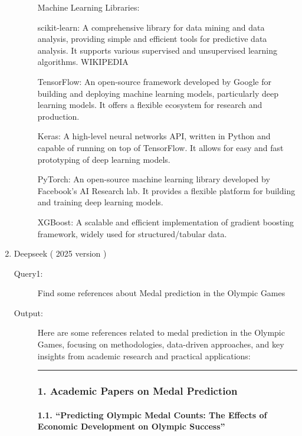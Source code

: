 \begin{enumerate}
\begin{description}
Machine Learning Libraries:

scikit-learn: A comprehensive library for data mining and data analysis, providing simple and efficient tools for predictive data analysis. It supports various supervised and unsupervised learning algorithms. 
WIKIPEDIA

TensorFlow: An open-source framework developed by Google for building and deploying machine learning models, particularly deep learning models. It offers a flexible ecosystem for research and production.

Keras: A high-level neural networks API, written in Python and capable of running on top of TensorFlow. It allows for easy and fast prototyping of deep learning models.

PyTorch: An open-source machine learning library developed by Facebook's AI Research lab. It provides a flexible platform for building and training deep learning models.

XGBoost: A scalable and efficient implementation of gradient boosting framework, widely used for structured/tabular data.
\end{description}

\item Deepseek ( 2025 version )
\begin{description}
    \item[Query1:] Find some references about Medal prediction in the Olympic Games 
    \item[Output:] 
    Here are some references related to medal prediction in the Olympic
Games, focusing on methodologies, data-driven approaches, and key
insights from academic research and practical applications:

\begin{center}\rule{0.5\linewidth}{0.5pt}\end{center}

\hypertarget{academic-papers-on-medal-prediction}{%
\subsubsection*{\texorpdfstring{\textbf{1. Academic Papers on Medal
Prediction}}{1. Academic Papers on Medal Prediction}}\label{academic-papers-on-medal-prediction}}

\hypertarget{predicting-olympic-medal-counts-the-effects-of-economic-development-on-olympic-success}{%
\paragraph{\texorpdfstring{\textbf{1.1. ``Predicting Olympic Medal
Counts: The Effects of Economic Development on Olympic
Success''}}{1.1. ``Predicting Olympic Medal Counts: The Effects of Economic Development on Olympic Success''}}\label{predicting-olympic-medal-counts-the-effects-of-economic-development-on-olympic-success}}


\end{description}
\end{enumerate}
